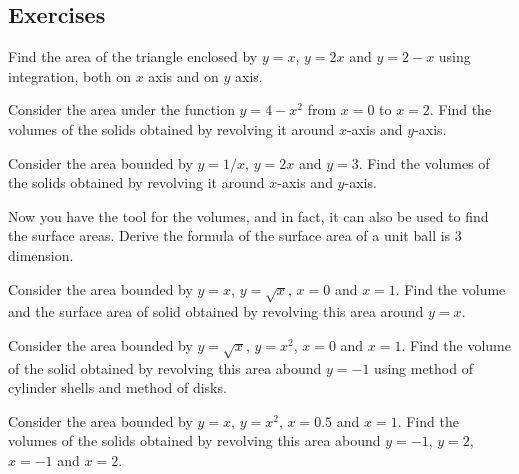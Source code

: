 \documentclass[Calculus 1 Recitation.tex]{subfiles}
\begin{document}
\subsection{Exercises}
\begin{myleftlinebox}
	Find the area of the triangle enclosed by $y=x$, $y=2x$ and $y=2-x$ using integration, both on $x$ axis and on $y$ axis.
	\tcblower
	\vspace{2em}
\end{myleftlinebox}

\begin{myleftlinebox}
	Consider the area under the function $y=4-x^2$ from $x=0$ to $x=2$. Find the volumes of the solids obtained by revolving it around $x$-axis and $y$-axis.
	\tcblower
	\vspace{2em}
\end{myleftlinebox}

\begin{myleftlinebox}
	Consider the area bounded by $y=1/x$, $y=2x$ and $y=3$. Find the volumes of the solids obtained by revolving it around $x$-axis and $y$-axis.
	\tcblower
	\vspace{2em}
\end{myleftlinebox}

\begin{myleftlinebox}
	Now you have the tool for the volumes, and in fact, it can also be used to find the surface areas. Derive the formula of the surface area of a unit ball is 3 dimension.
	\tcblower
	\vspace{2em}
\end{myleftlinebox}

\begin{myleftlinebox}
	Consider the area bounded by $y=x$, $y=\sqrt{x}$, $x=0$ and $x=1$. Find the volume and the surface area of solid obtained by revolving this area around $y=x$.
	\tcblower
	\vspace{2em}
\end{myleftlinebox}

\begin{myleftlinebox}
	Consider the area bounded by $y=\sqrt{x}$, $y=x^2$, $x=0$ and $x=1$. Find the volume of the solid obtained by revolving this area abound $y=-1$ using method of cylinder shells and method of disks.
	\tcblower
	\vspace{2em}
\end{myleftlinebox}

\begin{myleftlinebox}
	Consider the area bounded by $y=x$, $y=x^2$, $x=0.5$ and $x=1$. Find the volumes of the solids obtained by revolving this area abound $y=-1$, $y=2$, $x=-1$ and $x=2$.
	\tcblower
	\vspace{2em}
\end{myleftlinebox}
\end{document}
